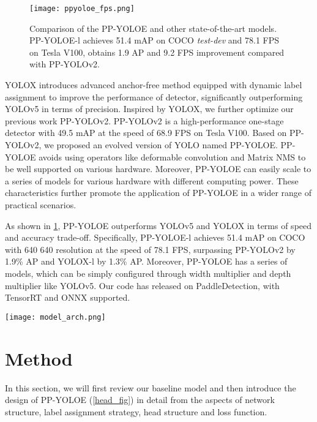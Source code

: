 \documentclass[final]{cvpr}
\begin{document}
\begin{figure}[ht]
\centering
\texttt{[image: ppyoloe\_fps.png]} 
\caption{Comparison of the PP-YOLOE and other state-of-the-art models. PP-YOLOE-l achieves 51.4 mAP on COCO \textit{test-dev} and  78.1 FPS on Tesla V100, obtains 1.9 AP and 9.2 FPS improvement compared with PP-YOLOv2\cite{huang2021pp-yolov2}. }
\label{figure1}
\end{figure}

YOLOX introduces advanced anchor-free method equipped with dynamic label assignment to improve the performance of detector, significantly outperforming YOLOv5\cite{glenn_jocher_2022_6222936} in terms of precision. Inspired  by YOLOX, we further optimize our previous work PP-YOLOv2\cite{huang2021pp-yolov2}. PP-YOLOv2 is a high-performance one-stage detector with 49.5 mAP at the speed of 68.9 FPS on Tesla V100. Based on PP-YOLOv2, we proposed an evolved version of YOLO named PP-YOLOE. PP-YOLOE avoids using operators like deformable convolution\cite{dai2017deformable, zhu2018deformable} and Matrix NMS\cite{wang2020solov2} to be well supported on various hardware. Moreover, PP-YOLOE can easily scale to a series of models for various hardware with different computing power. These characteristics further promote the application of PP-YOLOE in a wider range of practical scenarios.

As shown in \cref{figure1}, PP-YOLOE outperforms YOLOv5 and YOLOX in terms of speed and accuracy trade-off. Specifically, PP-YOLOE-l achieves 51.4 mAP on COCO with 640  640 resolution at the speed of 78.1 FPS, surpassing PP-YOLOv2 by 1.9\% AP and YOLOX-l by 1.3\% AP. Moreover, PP-YOLOE has a series of models, which can be simply configured through width multiplier and depth multiplier like YOLOv5. Our code has released on PaddleDetection\cite{ppdet2021}, with TensorRT and ONNX supported.



\begin{figure*}[ht]
	\centering
	\texttt{[image: model\_arch.png]}
	\caption{The model architecture of our PP-YOLOE. The backbone is CSPRepResNet, the neck is Path Aggregation Network (PAN), and the head is Efficient Task-aligned Head (ET-head). }
	\label{head_fig}
\end{figure*}

\section{Method}
In this section, we will first review our baseline model and then introduce the design of PP-YOLOE (\cref{head_fig}) in detail from the aspects of network structure, label assignment strategy, head structure and loss function.
\end{document}
